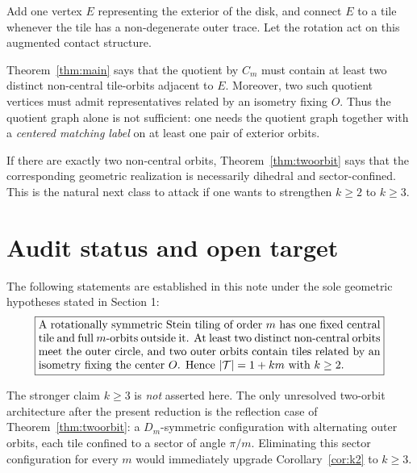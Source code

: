 \documentclass[10.5pt]{article}
\theoremstyle{remark}
\begin{document}
Add one vertex $E$ representing the exterior of the disk, and connect $E$ to a tile whenever the tile has a non-degenerate outer trace. Let the rotation act on this augmented contact structure.

Theorem~\ref{thm:main} says that the quotient by $C_m$ must contain at least two distinct non-central tile-orbits adjacent to $E$. Moreover, two such quotient vertices must admit representatives related by an isometry fixing $O$. Thus the quotient graph alone is not sufficient: one needs the quotient graph together with a \emph{centered matching label} on at least one pair of exterior orbits.

If there are exactly two non-central orbits, Theorem~\ref{thm:twoorbit} says that the corresponding geometric realization is necessarily dihedral and sector-confined. This is the natural next class to attack if one wants to strengthen $k\ge2$ to $k\ge3$.

\section{Audit status and open target}

The following statements are established in this note under the sole geometric hypotheses stated in Section 1:
\[
\boxed{
\begin{minipage}{0.88\linewidth}
A rotationally symmetric Stein tiling of order $m$ has one fixed central tile and full $m$-orbits outside it. At least two distinct non-central orbits meet the outer circle, and two outer orbits contain tiles related by an isometry fixing the center $O$. Hence $|\mathcal T|=1+km$ with $k\ge2$.
\end{minipage}}
\]

The stronger claim $k\ge3$ is \emph{not} asserted here. The only unresolved two-orbit architecture after the present reduction is the reflection case of Theorem~\ref{thm:twoorbit}: a $D_m$-symmetric configuration with alternating outer orbits, each tile confined to a sector of angle $\pi/m$. Eliminating this sector configuration for every $m$ would immediately upgrade Corollary~\ref{cor:k2} to $k\ge3$.
\end{document}
